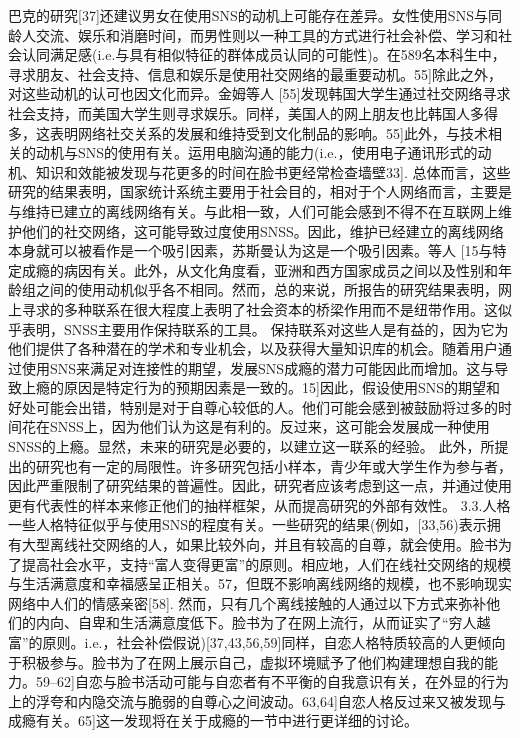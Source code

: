 巴克的研究[37]还建议男女在使用SNS的动机上可能存在差异。女性使用SNS与同龄人交流、娱乐和消磨时间，而男性则以一种工具的方式进行社会补偿、学习和社会认同满足感(i.e.与具有相似特征的群体成员认同的可能性)。在589名本科生中，寻求朋友、社会支持、信息和娱乐是使用社交网络的最重要动机。55]除此之外，对这些动机的认可也因文化而异。金姆等人 [55]发现韩国大学生通过社交网络寻求社会支持，而美国大学生则寻求娱乐。同样，美国人的网上朋友也比韩国人多得多，这表明网络社交关系的发展和维持受到文化制品的影响。55]此外，与技术相关的动机与SNS的使用有关。运用电脑沟通的能力(i.e.，使用电子通讯形式的动机、知识和效能被发现与花更多的时间在脸书更经常检查墙壁33].
总体而言，这些研究的结果表明，国家统计系统主要用于社会目的，相对于个人网络而言，主要是与维持已建立的离线网络有关。与此相一致，人们可能会感到不得不在互联网上维护他们的社交网络，这可能导致过度使用SNSS。因此，维护已经建立的离线网络本身就可以被看作是一个吸引因素，苏斯曼认为这是一个吸引因素。等人 [15与特定成瘾的病因有关。此外，从文化角度看，亚洲和西方国家成员之间以及性别和年龄组之间的使用动机似乎各不相同。然而，总的来说，所报告的研究结果表明，网上寻求的多种联系在很大程度上表明了社会资本的桥梁作用而不是纽带作用。这似乎表明，SNSS主要用作保持联系的工具。
保持联系对这些人是有益的，因为它为他们提供了各种潜在的学术和专业机会，以及获得大量知识库的机会。随着用户通过使用SNS来满足对连接性的期望，发展SNS成瘾的潜力可能因此而增加。这与导致上瘾的原因是特定行为的预期因素是一致的。15]因此，假设使用SNS的期望和好处可能会出错，特别是对于自尊心较低的人。他们可能会感到被鼓励将过多的时间花在SNSS上，因为他们认为这是有利的。反过来，这可能会发展成一种使用SNSS的上瘾。显然，未来的研究是必要的，以建立这一联系的经验。
此外，所提出的研究也有一定的局限性。许多研究包括小样本，青少年或大学生作为参与者，因此严重限制了研究结果的普遍性。因此，研究者应该考虑到这一点，并通过使用更有代表性的样本来修正他们的抽样框架，从而提高研究的外部有效性。
3.3.人格
一些人格特征似乎与使用SNS的程度有关。一些研究的结果(例如，[33,56)表示拥有大型离线社交网络的人，如果比较外向，并且有较高的自尊，就会使用。脸书为了提高社会水平，支持“富人变得更富”的原则。相应地，人们在线社交网络的规模与生活满意度和幸福感呈正相关。57，但既不影响离线网络的规模，也不影响现实网络中人们的情感亲密[58].
然而，只有几个离线接触的人通过以下方式来弥补他们的内向、自卑和生活满意度低下。脸书为了在网上流行，从而证实了“穷人越富”的原则。i.e.，社会补偿假说)[37,43,56,59]同样，自恋人格特质较高的人更倾向于积极参与。脸书为了在网上展示自己，虚拟环境赋予了他们构建理想自我的能力。59–62]自恋与脸书活动可能与自恋者有不平衡的自我意识有关，在外显的行为上的浮夸和内隐交流与脆弱的自尊心之间波动。63,64]自恋人格反过来又被发现与成瘾有关。65]这一发现将在关于成瘾的一节中进行更详细的讨论。
